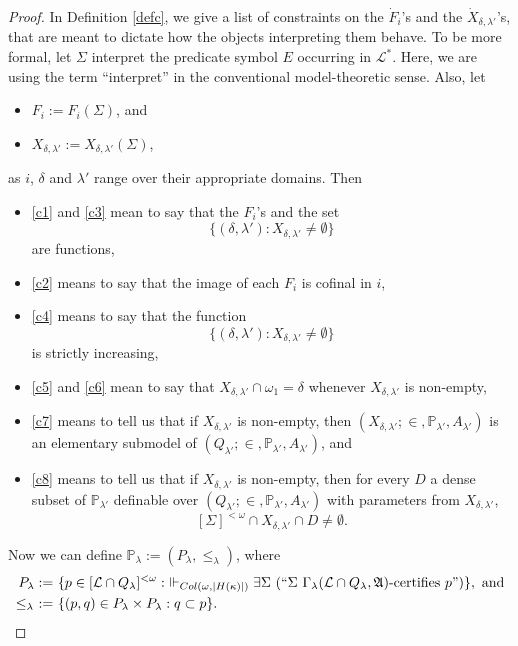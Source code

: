 \documentclass[12pt]{article}
\numberwithin{equation}{section}
\begin{document}
\begin{proof}
In Definition \ref{defc}, we give a list of constraints on the $\dot{F}_i$'s and the $\dot{X}_{\delta, \lambda'}$'s, that are meant to dictate how the objects interpreting them behave. To be more formal, let $\Sigma$ interpret the predicate symbol $E$ occurring in $\mathcal{L}^*$. Here, we are using the term ``interpret'' in the conventional model-theoretic sense. Also, let
\begin{itemize}
    \item $F_i := F_i(\Sigma)$, and
    \item $X_{\delta, \lambda'} := X_{\delta, \lambda'}(\Sigma)$,
\end{itemize}
as $i$, $\delta$ and $\lambda'$ range over their appropriate domains. Then
\begin{itemize}
    \item \ref{c1} and \ref{c3} mean to say that the $F_i$'s and the set $$\{(\delta, \lambda') : X_{\delta, \lambda'} \neq \emptyset\}$$ are functions,
    \item \ref{c2} means to say that the image of each $F_i$ is cofinal in $i$,
    \item \ref{c4} means to say that the function $$\{(\delta, \lambda') : X_{\delta, \lambda'} \neq \emptyset\}$$ is strictly increasing,
    \item \ref{c5} and \ref{c6} mean to say that $X_{\delta, \lambda'} \cap \omega_1 = \delta$ whenever $X_{\delta, \lambda'}$ is non-empty,
    \item \ref{c7} means to tell us that if $X_{\delta, \lambda'}$ is non-empty, then $(X_{\delta, \lambda'}; \in,  \mathbb{P}_{\lambda'}, A_{\lambda'})$ is an elementary submodel of $(Q_{\lambda'}; \in,  \mathbb{P}_{\lambda'}, A_{\lambda'})$, and
    \item \ref{c8} means to tell us that if $X_{\delta, \lambda'}$ is non-empty, then for every $D$ a dense subset of $\mathbb{P}_{\lambda'}$ definable over $(Q_{\lambda'}; \in, \mathbb{P}_{\lambda'}, A_{\lambda'})$ with parameters from $X_{\delta, \lambda'}$, $$[\Sigma]^{< \omega} \cap X_{\delta, \lambda'} \cap D \neq \emptyset.$$ 
\end{itemize}

Now we can define $\mathbb{P}_{\lambda} := (P_{\lambda}, \leq_{\lambda})$, where
\begin{align*}
    P_{\lambda} := \ & \{p \in [\mathcal{L} \cap Q_{\lambda}]^{< \omega} : \ \Vdash_{Col(\omega, |H(\kappa)|)} \exists \Sigma \ (``\Sigma \ \Gamma_{\lambda} (\mathcal{L} \cap Q_{\lambda}, \mathfrak{A}) \text{-certifies } p")\}, \text{ and} \\
    \leq_{\lambda} \ := \ & \{(p, q) \in P_{\lambda} \times P_{\lambda} : q \subset p\}.
\end{align*}


\end{proof}
\end{document}
